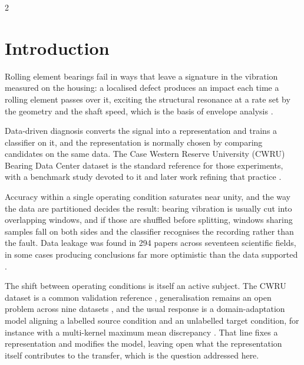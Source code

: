 \documentclass[12pt,twoside,titlepage]{ingenius}
\begin{document}
\begin{multicols}{2}
\raggedcolumns
\section{Introduction}

Rolling element bearings fail in ways that leave a signature in the vibration
measured on the housing: a localised defect produces an impact each time a
rolling element passes over it, exciting the structural resonance at a rate set
by the geometry and the shaft speed, which is the basis of envelope analysis
\cite{randall2011}.

Data-driven diagnosis converts the signal into a representation and trains a
classifier on it, and the representation is normally chosen by comparing
candidates on the same data. The Case Western Reserve University (CWRU) Bearing
Data Center dataset \cite{cwru} is the standard reference for those experiments,
with a benchmark study devoted to it \cite{smith2015} and later work refining
that practice \cite{hendriks2022}.

Accuracy within a single operating condition saturates near unity, and the way
the data are partitioned decides the result: bearing vibration is usually cut
into overlapping windows, and if those are shuffled before splitting, windows
sharing samples fall on both sides and the classifier recognises the recording
rather than the fault. Data leakage was found in 294 papers across
seventeen scientific fields, in some cases producing conclusions far more
optimistic than the data supported \cite{kapoor2023}.

The shift between operating conditions is itself an active subject. The CWRU
dataset is a common validation reference \cite{neupane2020}, generalisation
remains an open problem across nine datasets \cite{zhao2020}, and the usual
response is a domain-adaptation model aligning a labelled source condition and
an unlabelled target condition, for instance with a multi-kernel maximum mean
discrepancy \cite{li2019}. That line fixes a representation and modifies the
model, leaving open what the representation itself contributes to the transfer,
which is the question addressed here.


\end{multicols}
\end{document}
